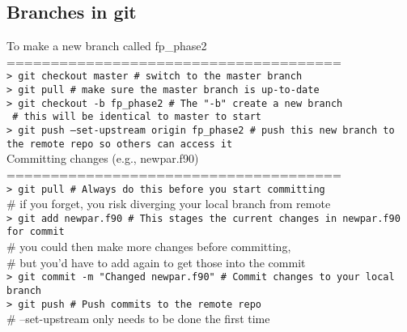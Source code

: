 \subsection{Branches in git}

To make a new branch called fp\_phase2
\\
======================================
\\
\texttt{> git checkout master                      \# switch to the master branch}
\\
\texttt{> git pull
                                 \# make sure the master branch is up-to-date
}
\\
\texttt{> git checkout -b fp\_phase2                \# The "-b" create a new branch
}
\\
\texttt{
                                           \#   this will be identical to master to start
}
\\
\texttt{> git push --set-upstream origin fp\_phase2 \# push this new branch to the remote repo so others can access it
}
\\

Committing changes (e.g., newpar.f90)
\\
======================================
\\
\texttt{> git pull                           \# Always do this before you start committing
}
\\
                                     \#   if you forget, you risk diverging your local branch from remote
\\
\texttt{> git add newpar.f90                 \# This stages the current changes in newpar.f90 for commit
}
\\
                                     \#   you could then make more changes before committing,
\\
                                     \#   but you'd have to add again to get those into the commit
\\
\texttt{> git commit -m "Changed newpar.f90" \# Commit changes to your local branch 
}
\\
\texttt{> git push                           \# Push commits to the remote repo
}
\\
                                     \#   --set-upstream only needs to be done the first time
\\

